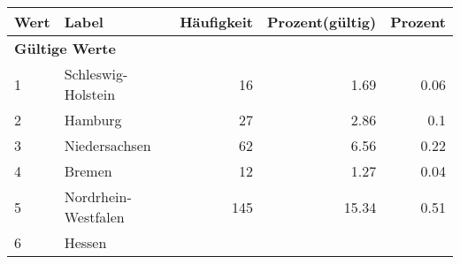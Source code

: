      \begin{longtable}{lXrrr}
     \toprule
     \textbf{Wert} & \textbf{Label} & \textbf{Häufigkeit} & \textbf{Prozent(gültig)} & \textbf{Prozent} \\
     \endhead
     \midrule
     \multicolumn{5}{l}{\textbf{Gültige Werte}}\\

     1 &
     \multicolumn{1}{X}{ Schleswig-Holstein   } &


       \num{16} &
       \num[round-mode=places,round-precision=2]{1,69} &
         \num[round-mode=places,round-precision=2]{0,06} \\

     2 &
     \multicolumn{1}{X}{ Hamburg   } &


       \num{27} &
       \num[round-mode=places,round-precision=2]{2,86} &
         \num[round-mode=places,round-precision=2]{0,1} \\

     3 &
     \multicolumn{1}{X}{ Niedersachsen   } &


       \num{62} &
       \num[round-mode=places,round-precision=2]{6,56} &
         \num[round-mode=places,round-precision=2]{0,22} \\

     4 &
     \multicolumn{1}{X}{ Bremen   } &


       \num{12} &
       \num[round-mode=places,round-precision=2]{1,27} &
         \num[round-mode=places,round-precision=2]{0,04} \\

     5 &
     \multicolumn{1}{X}{ Nordrhein-Westfalen   } &


       \num{145} &
       \num[round-mode=places,round-precision=2]{15,34} &
         \num[round-mode=places,round-precision=2]{0,51} \\

     6 &
     \multicolumn{1}{X}{ Hessen   } &



\end{longtable}
